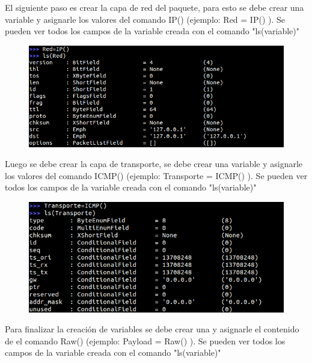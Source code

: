 \documentclass[spanish]{udpreport}
\begin{document}
\vspace{14cm}

El siguiente paso es crear la capa de red del paquete, para esto se debe crear una variable y asignarle los valores del comando IP() (ejemplo: Red = IP() ). Se pueden ver todos los campos de la variable creada con el comando "ls(variable)"\\

\begin{figure}[H]
\begin{center}
\includegraphics[scale=0.7]{images/2.png}
\end{center}
\end{figure}

Luego se debe crear la capa de transporte, se debe crear una variable y asignarle los valores del comando  ICMP() (ejemplo: Transporte = ICMP() ). Se pueden ver todos los campos de la variable creada con el comando "ls(variable)"\\

\begin{figure}[H]
\begin{center}
\includegraphics[scale=0.7]{images/3.png}
\end{center}
\end{figure}

\vspace{14cm}

Para finalizar la creación de variables se debe crear una y asignarle el contenido de el comando Raw() (ejemplo: Payload = Raw() ). Se pueden ver todos los campos de la variable creada con el comando "ls(variable)"\\
\end{document}
